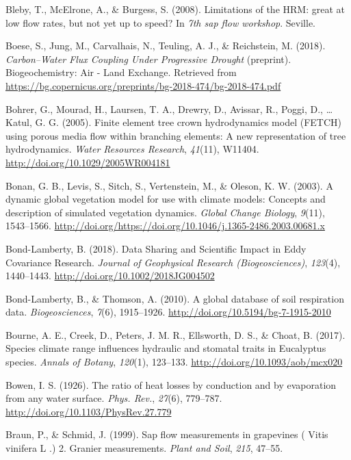 \documentclass[11pt,twoside]{reedthesis}
\begin{document}
\hypertarget{ref-Bleby2008}{}
Bleby, T., McElrone, A., \& Burgess, S. (2008). Limitations of the HRM:
great at low flow rates, but not yet up to speed? In \emph{7th sap flow
workshop}. Seville.

\hypertarget{ref-boese_carbonwater_2018}{}
Boese, S., Jung, M., Carvalhais, N., Teuling, A. J., \& Reichstein, M.
(2018). \emph{Carbon--Water Flux Coupling Under Progressive Drought}
(preprint). Biogeochemistry: Air - Land Exchange. Retrieved from
\url{https://bg.copernicus.org/preprints/bg-2018-474/bg-2018-474.pdf}

\hypertarget{ref-Bohrer2005}{}
Bohrer, G., Mourad, H., Laursen, T. A., Drewry, D., Avissar, R., Poggi,
D., \ldots{} Katul, G. G. (2005). Finite element tree crown
hydrodynamics model (FETCH) using porous media flow within branching
elements: A new representation of tree hydrodynamics. \emph{Water
Resources Research}, \emph{41}(11), W11404.
\url{http://doi.org/10.1029/2005WR004181}

\hypertarget{ref-Bonan2003}{}
Bonan, G. B., Levis, S., Sitch, S., Vertenstein, M., \& Oleson, K. W.
(2003). A dynamic global vegetation model for use with climate models:
Concepts and description of simulated vegetation dynamics. \emph{Global
Change Biology}, \emph{9}(11), 1543--1566.
\url{http://doi.org/https://doi.org/10.1046/j.1365-2486.2003.00681.x}

\hypertarget{ref-Bond-Lamberty2018}{}
Bond-Lamberty, B. (2018). Data Sharing and Scientific Impact in Eddy
Covariance Research. \emph{Journal of Geophysical Research
(Biogeosciences)}, \emph{123}(4), 1440--1443.
\url{http://doi.org/10.1002/2018JG004502}

\hypertarget{ref-Bond-Lamberty2010}{}
Bond-Lamberty, B., \& Thomson, A. (2010). A global database of soil
respiration data. \emph{Biogeosciences}, \emph{7}(6), 1915--1926.
\url{http://doi.org/10.5194/bg-7-1915-2010}

\hypertarget{ref-bourne_species_2017}{}
Bourne, A. E., Creek, D., Peters, J. M. R., Ellsworth, D. S., \& Choat,
B. (2017). Species climate range influences hydraulic and stomatal
traits in Eucalyptus species. \emph{Annals of Botany}, \emph{120}(1),
123--133. \url{http://doi.org/10.1093/aob/mcx020}

\hypertarget{ref-Bowen1926}{}
Bowen, I. S. (1926). The ratio of heat losses by conduction and by
evaporation from any water surface. \emph{Phys. Rev.}, \emph{27}(6),
779--787. \url{http://doi.org/10.1103/PhysRev.27.779}

\hypertarget{ref-Braun1999}{}
Braun, P., \& Schmid, J. (1999). Sap flow measurements in grapevines (
Vitis vinifera L .) 2. Granier measurements. \emph{Plant and Soil},
\emph{215}, 47--55.
\end{document}
